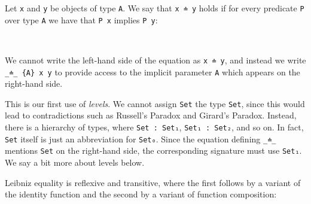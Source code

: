 Let \texttt{x} and \texttt{y} be objects of type \texttt{A}. We say that
\texttt{x\ ≐\ y} holds if for every predicate \texttt{P} over type
\texttt{A} we have that \texttt{P\ x} implies \texttt{P\ y}:

\begin{fence}
\begin{code}%
\>[0]\AgdaSpace{}%
\AgdaSymbol{:}\AgdaSpace{}%
\AgdaSpace{}%
\AgdaSymbol{\{}\AgdaSpace{}%
\AgdaSymbol{:}\AgdaSpace{}%
\AgdaSymbol{\}}\AgdaSpace{}%
\AgdaSymbol{(}\AgdaSpace{}%
\AgdaSpace{}%
\AgdaSymbol{:}\AgdaSpace{}%
\AgdaSymbol{)}\AgdaSpace{}%
\AgdaSpace{}%
\<%
\\
\>[0]\AgdaSpace{}%
\AgdaSymbol{\{}\AgdaSymbol{\}}\AgdaSpace{}%
\AgdaSpace{}%
\AgdaSpace{}%
\AgdaSymbol{=}\AgdaSpace{}%
\AgdaSpace{}%
\AgdaSymbol{(}\AgdaSpace{}%
\AgdaSymbol{:}\AgdaSpace{}%
\AgdaSpace{}%
\AgdaSpace{}%
\AgdaSymbol{)}\AgdaSpace{}%
\AgdaSpace{}%
\AgdaSpace{}%
\AgdaSpace{}%
\AgdaSpace{}%
\AgdaSpace{}%
\<%
\end{code}
\end{fence}

We cannot write the left-hand side of the equation as \texttt{x\ ≐\ y},
and instead we write \texttt{\_≐\_\ \{A\}\ x\ y} to provide access to
the implicit parameter \texttt{A} which appears on the right-hand side.

This is our first use of \emph{levels}. We cannot assign \texttt{Set}
the type \texttt{Set}, since this would lead to contradictions such as
Russell's Paradox and Girard's Paradox. Instead, there is a hierarchy of
types, where \texttt{Set\ :\ Set₁}, \texttt{Set₁\ :\ Set₂}, and so on.
In fact, \texttt{Set} itself is just an abbreviation for \texttt{Set₀}.
Since the equation defining \texttt{\_≐\_} mentions \texttt{Set} on the
right-hand side, the corresponding signature must use \texttt{Set₁}. We
say a bit more about levels below.

Leibniz equality is reflexive and transitive, where the first follows by
a variant of the identity function and the second by a variant of
function composition:

